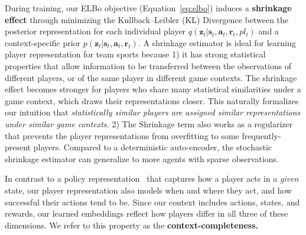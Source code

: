 \documentclass[letterpaper]{article} %
\newcommand{\latentvariables}{\mathbf{z}}
\newcommand{\state}{\mathbf{s}}
\newcommand{\action}{\mathbf{a}}
\newcommand{\reward}{\boldsymbol{r}}
\newcommand{\player}{pl}
\begin{document}
During training, our ELBo objective (Equation~\ref{eq:elbo}) induces a {\bf shrinkage effect} through minimizing the Kullback–Leibler (KL) Divergence between the posterior representation for each individual player $q(\latentvariables_{t}|\state_{t},\action_{t},\reward_{t},\player_{t})$ and a context-specific prior $p(\latentvariables_{t}|\state_{t},\action_{t},\reward_{t})$. A shrinkage estimator is ideal for learning player representation for team sports because 1) it has strong statistical properties that allow information to be transferred between the observations of different players, or of the same player in different game contexts. 
The shrinkage effect becomes stronger for players who share many statistical similarities under a game context, which %
draws their representations closer.
This naturally formalizes our intuition that {\em statistically similar players are assigned similar representations under similar game contexts.} 
2) The Shrinkage term also works as a regularizer that prevents the player representations from overfitting to some frequently-present players. Compared to a deterministic auto-encoder, the stochastic shrinkage estimator can generalize to more agents with sparse observations.

In contrast to a policy representation~\cite{GroverRepresent18,WhitneyACG20,ChandakAction19} that captures how a player acts in a {\em given} state, our player representation also models when and where they act, and how successful their actions tend to be. Since our context includes actions, states, and rewards, our learned embeddings reflect how players differ in all three of these dimensions. We refer to this property as the \textbf{context-completeness.}
\end{document}
